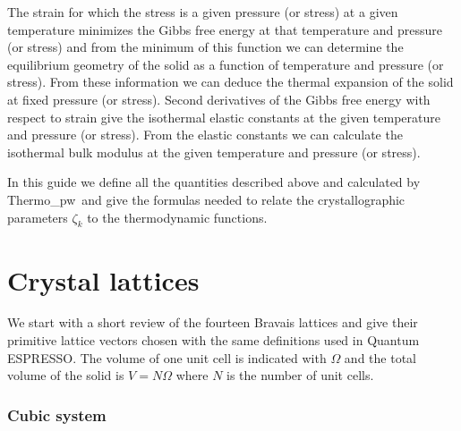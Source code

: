 \documentclass[12pt,a4paper,twoside]{report}
\def\qe{{\sc Quantum ESPRESSO}}
\def\tpw{{\sc Thermo\_pw}}
\begin{document}
The strain for which the stress is a given pressure (or stress) at a given
temperature minimizes the Gibbs free energy at that temperature and
pressure (or stress) and from the minimum of this function we can determine 
the equilibrium geometry of the solid as a function of temperature and 
pressure (or stress). 
From these information we can deduce the thermal expansion of the 
solid at fixed pressure (or stress). Second derivatives of the Gibbs free
energy with respect to strain give the isothermal elastic constants at the 
given temperature and pressure (or stress). From the elastic constants 
we can calculate the isothermal bulk modulus at the
given temperature and pressure (or stress).

In this guide we define all the quantities described above and calculated 
by \tpw\ and give the formulas needed to relate the crystallographic
parameters $\zeta_k$ to the thermodynamic functions.

\newpage

{\color{dark-blue}\chapter{Crystal lattices}}
\color{black}

We start with a short review of the fourteen Bravais lattices and 
give their primitive lattice vectors chosen with the same definitions used
in \qe. 
The volume of one unit cell is indicated with $\Omega$ and the total 
volume of the solid is $V=N\Omega$ where $N$ is the number of unit cells.

{\color{web-blue}\subsection{Cubic system}}
\color{black}
\end{document}
